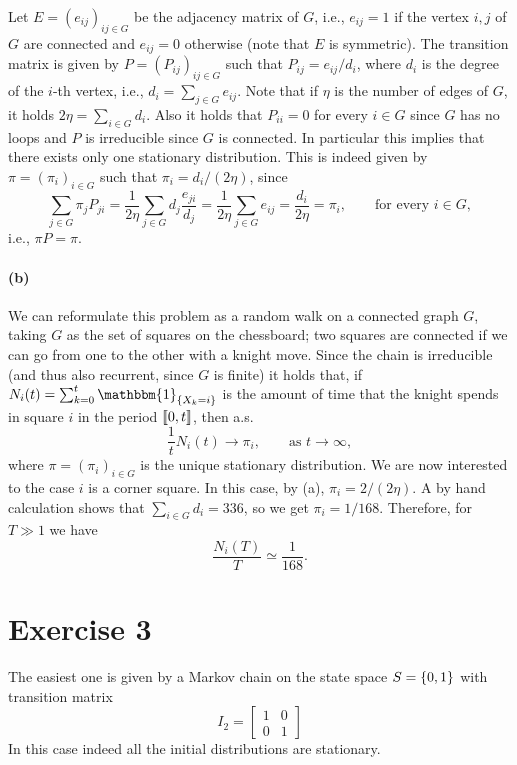 \documentclass[a4paper,11pt]{article}
\theoremstyle{definition}
\theoremstyle{plain}
\theoremstyle{remark}
\DeclarePairedDelimiter{\parqq}{\llbracket}{\rrbracket}
\DeclarePairedDelimiter{\bra}{\lbrace}{\rbrace}
\begin{document}
Let $E=(e_{ij})_{ij\in G}$ be the adjacency matrix of $G$, i.e., $e_{ij}=1$ if the vertex $i,j$ of $G$ are connected and $e_{ij}=0$ otherwise (note that $E$ is symmetric). The transition matrix is given by $P = (P_{ij})_{ij\in G}$ such that $P_{ij} = e_{ij}/d_i$, where $d_i$ is the degree of the $i$-th vertex, i.e., $d_i = \sum_{j\in G}e_{ij}$. Note that if $\eta$ is the number of edges of $G$, it holds $2\eta=\sum_{i\in G}d_i$. Also it holds that $P_{ii}=0$ for every $i\in G$ since $G$ has no loops and $P$ is irreducible since $G$ is connected. In particular this implies that there exists only one stationary distribution. This is indeed given by $\pi = (\pi_i)_{i\in G}$ such that $\pi_i = d_i/(2\eta)$, since
$$
\sum_{j\in G} \pi_jP_{ji} = \frac{1}{2\eta}\sum_{j\in G} d_j\frac{e_{ji}}{d_j} = \frac{1}{2\eta}\sum_{j\in G} e_{ij} = \frac{d_i}{2\eta} = \pi_i, \qquad \text{for every } i\in G,
$$ 
i.e., $\pi P=\pi$.

\paragraph*{(b)}

We can reformulate this problem as a random walk on a connected graph $G$, taking $G$ as the set of squares on the chessboard; two squares are connected if we can go from one to the other with a knight move. Since the chain is irreducible (and thus also recurrent, since $G$ is finite) it holds that, if $N_i(t)=\sum_{k=0}^t\mathbbm{1}_{\bra{X_k=i}}$ is the amount of time that the knight spends in square $i$ in the period $\parqq{0,t}$, then a.s.
$$
\frac{1}{t}N_i(t) \to \pi_i, \qquad \text{as } t\to\infty,
$$
where $\pi = (\pi_i)_{i\in G}$ is the unique stationary distribution. We are now interested to the case $i$ is a corner square. In this case, by (a), $\pi_i=2/(2\eta)$. 
A by hand calculation shows that $\sum_{i\in G} d_i = 336$, so we get $\pi_i = 1/168$. Therefore, for $T\gg1$ we have
$$
\frac{N_i(T)}{T} \simeq \frac{1}{168}.
$$

\section*{Exercise 3}

The easiest one is given by a Markov chain on the state space $S=\bra{0,1}$ with transition matrix 
$$
I_2 = \begin{bmatrix}
1 & 0 \\ 0 & 1
\end{bmatrix}
$$ 
In this case indeed all the initial distributions are stationary.  
\end{document}
